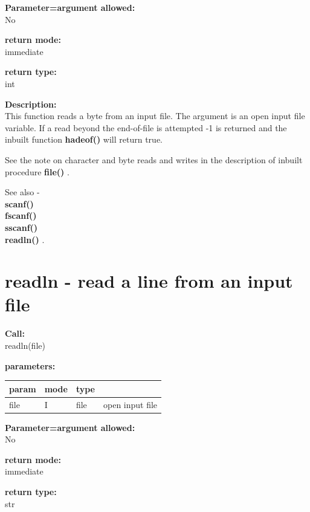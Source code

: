         {\bf Parameter=argument allowed:} \\
        No
        
        {\bf return mode:} \\
        immediate

        {\bf return type:} \\
        int
        
        {\bf Description:} \\
        This function reads a byte from an input file. The argument is
        an open input file variable. If a read beyond the end-of-file is
        attempted -1 is returned and the inbuilt function {\bf
        hadeof()} will return true.
        
        See the note on character and byte reads and writes in the description
        of inbuilt procedure {\bf file()} .
        
        See also - \\
        {\bf scanf()}  \\
        {\bf fscanf()}  \\
        {\bf sscanf()}  \\
        {\bf readln()} .


    \section{readln - read a line from an input file}\label{sec:ifreadln}
        
        {\bf Call:} \\
        readln(file)
        
        {\bf parameters:} \\
        \begin{tabular}{| l | l | l | l |}
        \hline
        param  & mode & type & \\
        \hline \hline
        file & I & file & open input file  \\ \hline
        \end{tabular}
        
        {\bf Parameter=argument allowed:} \\
        No
        
        {\bf return mode:} \\
        immediate

        {\bf return type:} \\
        str
        
